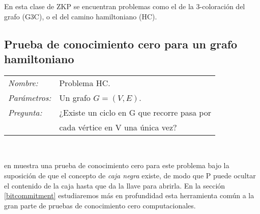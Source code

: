 \hfil

En esta clase de ZKP se encuentran problemas como el de la 3-coloración del grafo (G3C), o el del camino hamiltoniano (HC).


\subsection{Prueba de conocimiento cero para un grafo hamiltoniano}

\hfil

\begin{tabular}{|ll}
	\textit{Nombre:} & Problema HC. \\
	\textit{Parámetros:} &Un grafo $G=(V,E)$. \\
	\textit{Pregunta:} & ¿Existe un ciclo en G que recorre pasa por\\& cada vértice en V una única vez? \\
\end{tabular}
\\

\hfil

\citeauthor{blum} en  \citep{blum} muestra una prueba de conocimiento cero para este problema bajo la suposición de que el concepto de \textit{caja negra} existe, de modo que P puede ocultar el contenido de la caja hasta que da la llave para abrirla. En la sección \ref{bitcommitment} estudiaremos más en profundidad esta herramienta común a la gran parte de pruebas de conocimiento cero computacionales.

\hfil

